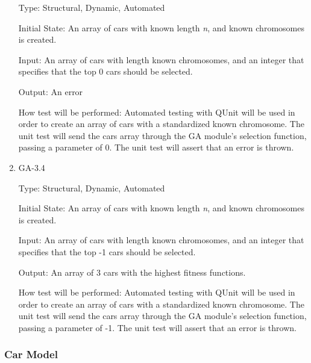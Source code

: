 \documentclass[12pt, titlepage]{article}
\begin{document}
\begin{enumerate}
Type: Structural, Dynamic, Automated
					
Initial State: An array of cars with known length \textit{n}, and known chromosomes is created.
					
Input: An array of cars with length known chromosomes, and an integer that specifies that the top  0 cars should be selected.
					
Output: An error
					
How test will be performed: Automated testing with QUnit will be used in order to create an array of cars with a standardized known chromosome. The unit test will send the cars array through the GA module's selection function, passing a parameter of 0. The unit test will assert that an error is thrown.


\item{GA-3.4\\}

Type: Structural, Dynamic, Automated
					
Initial State: An array of cars with known length \textit{n}, and known chromosomes is created.
					
Input: An array of cars with length known chromosomes, and an integer that specifies that the top  -1 cars should be selected.
					
Output: An array of 3 cars with the highest fitness functions.
					
How test will be performed: Automated testing with QUnit will be used in order to create an array of cars with a standardized known chromosome. The unit test will send the cars array through the GA module's selection function, passing a parameter of -1. The unit test will assert that an error is thrown.

\end{enumerate}

\subsubsection{Car Model}
\end{document}
